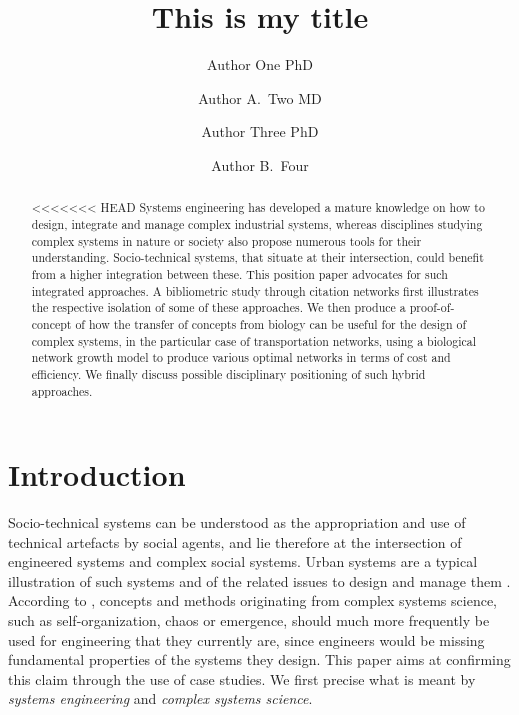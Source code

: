 \documentclass[alpha-refs]{wiley-article}
\title{This is my title}
\author[1\authfn{1}]{Author One PhD}
\author[2\authfn{1}]{Author A.~Two MD}
\author[2\authfn{2}]{Author Three PhD}
\author[2]{Author B.~Four}
\affil[1]{Department, Institution, City, State or Province, Postal Code, Country}
\affil[2]{Department, Institution, City, State or Province, Postal Code, Country}
\begin{document}
\maketitle

\begin{abstract}
<<<<<<< HEAD
Systems engineering has developed a mature knowledge on how to design, integrate and manage complex industrial systems, whereas disciplines studying complex systems in nature or society also propose numerous tools for their understanding. Socio-technical systems, that situate at their intersection, could benefit from a higher integration between these. This position paper advocates for such integrated approaches. A bibliometric study through citation networks first illustrates the respective isolation of some of these approaches. We then produce a proof-of-concept of how the transfer of concepts from biology can be useful for the design of complex systems, in the particular case of transportation networks, using a biological network growth model to produce various optimal networks in terms of cost and efficiency. We finally discuss possible disciplinary positioning of such hybrid approaches.
\end{abstract}




\cite{bar2003systems}


\section{Introduction}



Socio-technical systems can be understood as the appropriation and use of technical artefacts by social agents, and lie therefore at the intersection of engineered systems and complex social systems. Urban systems are a typical illustration of such systems and of the related issues to design and manage them \cite{portugali2012complexity}. According to \cite{sheard2009principles}, concepts and methods originating from complex systems science, such as self-organization, chaos or emergence, should much more frequently be used for engineering that they currently are, since engineers would be missing fundamental properties of the systems they design. This paper aims at confirming this claim through the use of case studies. We first precise what is meant by \emph{systems engineering} and \emph{complex systems science}.
\end{document}
